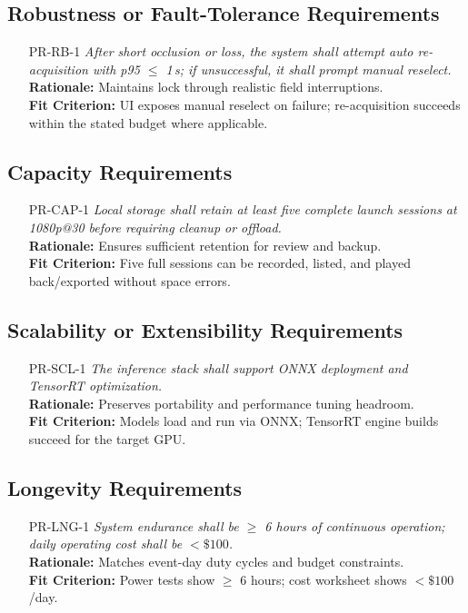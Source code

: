 \documentclass[12pt]{article}
\begin{document}
\subsection{Robustness or Fault-Tolerance Requirements}
\begin{itemize}[leftmargin=*]
  \item[PR-RB-1] \emph{After short occlusion or loss, the system shall attempt auto
          re-acquisition with p95 $\leq$ 1\,s; if unsuccessful, it shall prompt manual
          reselect.}\\ \textbf{Rationale:} Maintains lock through realistic field
        interruptions.\\ \textbf{Fit Criterion:} UI exposes manual reselect on failure;
        re-acquisition succeeds within the stated budget where applicable.
\end{itemize}

\subsection{Capacity Requirements}
\begin{itemize}[leftmargin=*]
  \item[PR-CAP-1] \emph{Local storage shall retain at least five complete launch
          sessions at 1080p@30 before requiring cleanup or offload.}\\
        \textbf{Rationale:} Ensures sufficient retention for review and backup.\\
        \textbf{Fit Criterion:} Five full sessions can be recorded, listed, and played
        back/exported without space errors.
\end{itemize}

\subsection{Scalability or Extensibility Requirements}
\begin{itemize}[leftmargin=*]
  \item[PR-SCL-1] \emph{The inference stack shall support ONNX deployment and TensorRT
          optimization.}\\ \textbf{Rationale:} Preserves portability and performance
        tuning headroom.\\ \textbf{Fit Criterion:} Models load and run via ONNX;
        TensorRT engine builds succeed for the target GPU.
\end{itemize}

\subsection{Longevity Requirements}
\begin{itemize}[leftmargin=*]
  \item[PR-LNG-1] \emph{System endurance shall be $\geq$ 6 hours of continuous
          operation; daily operating cost shall be $<\$100$.}\\ \textbf{Rationale:}
        Matches event-day duty cycles and budget constraints.\\ \textbf{Fit Criterion:}
        Power tests show $\geq$ 6 hours; cost worksheet shows $<\$100$/day.
\end{itemize}
\end{document}
